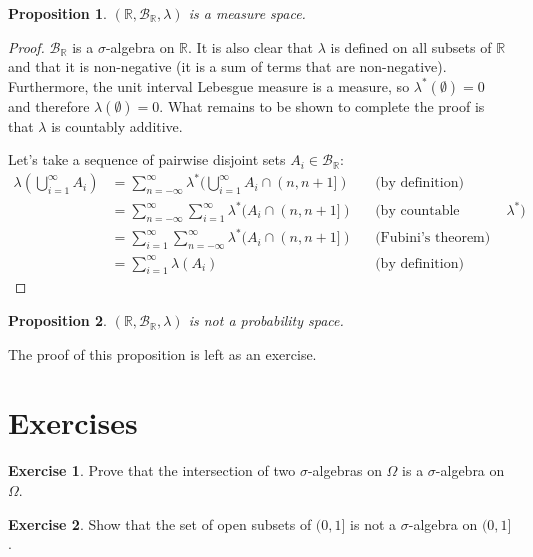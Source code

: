 \documentclass{book}
\theoremstyle{plain}%
\newtheorem{proposition}{Proposition}[section]
\theoremstyle{definition}
\newtheorem{exercise}{Exercise}[chapter]
\begin{document}
\begin{proposition} $(\mathbb{R}, \mathcal{B}_\mathbb{R}, \lambda)$ is a measure space.
\end{proposition}

\begin{proof}
$\mathcal{B}_\mathbb{R}$ is a $\sigma$-algebra on $\mathbb{R}$. It is also clear that $\lambda$ is defined on all subsets of $\mathbb{R}$ and that it is non-negative (it is a sum of terms that are non-negative). Furthermore, the unit interval Lebesgue measure is a measure, so $\lambda^*(\emptyset) = 0$ and therefore $\lambda(\emptyset) = 0$. What remains to be shown to complete the proof is that $\lambda$ is countably additive.

Let's take a sequence of pairwise disjoint sets $A_i \in \mathcal{B}_\mathbb{R}$:
\begin{align*}
    \lambda\left(\bigcup_{i=1}^\infty A_i\right) &=  \sum_{n = -\infty}^\infty \lambda^*( \bigcup_{i=1}^\infty A_i \cap (n, n+1])&& \text{(by definition)}\\
 &=  \sum_{n = -\infty}^\infty \sum_{i=1}^\infty  \lambda^*( A_i \cap (n, n+1])&& \text{(by countable additivity of $\lambda^*$)}\\
 &=  \sum_{i=1}^\infty \sum_{n = -\infty}^\infty  \lambda^*( A_i \cap (n, n+1])&& \text{(Fubini's theorem)}\\
 &= \sum_{i=1}^\infty  \lambda(A_i)&& \text{(by definition)}
\end{align*}
\end{proof}

\begin{proposition} $(\mathbb{R}, \mathcal{B}_\mathbb{R}, \lambda)$ is not a probability space.\label{prop:infinite}
\end{proposition}

The proof of this proposition is left as an exercise.

\section*{Exercises}

\begin{exercise}
Prove that the intersection of two $\sigma$-algebras on $\Omega$ is a $\sigma$-algebra on $\Omega$.
\end{exercise}

\begin{exercise}
Show that the set of open subsets of $(0,1]$ is not a $\sigma$-algebra on $(0,1]$.\label{ex:001}
\end{exercise}
\end{document}
